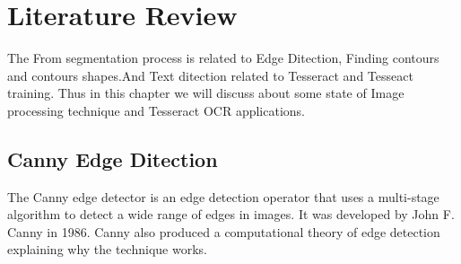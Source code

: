 \chapter {Literature Review}
\label{literature_review}
The From segmentation process is related to Edge Ditection, Finding contours and contours shapes.And Text ditection related to Tesseract and Tesseact training. Thus in this chapter we will discuss about some state of Image processing technique and Tesseract OCR applications.
\section{Canny Edge Ditection}
The Canny edge detector is an edge detection operator that uses a multi-stage algorithm to detect a wide range of edges in images. It was developed by John F. Canny in 1986. Canny also produced a computational theory of edge detection explaining why the technique works. \cite{EdgeDetection} \cite{CannyEdgeDetection3}
